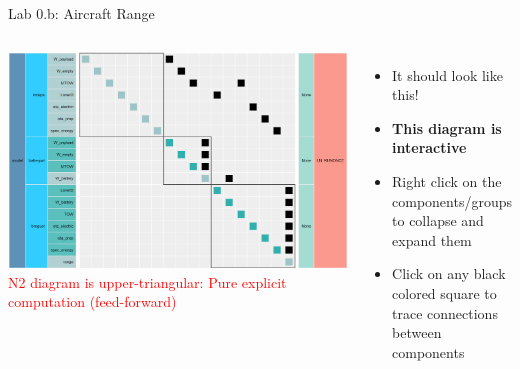 \documentclass[aspectratio=169, usenames,dvipsnames, 14pt]{beamer}
\begin{document}
\begin{frame}{Lab 0.b: Aircraft Range}
    \begin{columns}
            \includegraphics[scale=0.3]{images/n2_48.PNG}\newline   %
            \footnotesize \textcolor{red}{N2 diagram is upper-triangular:
            Pure explicit \newline computation (feed-forward)}

            \begin{itemize}
                \item It should look like this!
                \vspace{0.5cm}
                \item \textbf{This diagram is interactive}
                \vspace{0.5cm}
                \item Right click on the components/groups to collapse and expand them
                \vspace{0.5cm}
                \item Click on any black colored square to trace connections between components
            \end{itemize}
    \end{columns}
\end{frame}         %

\end{document}
